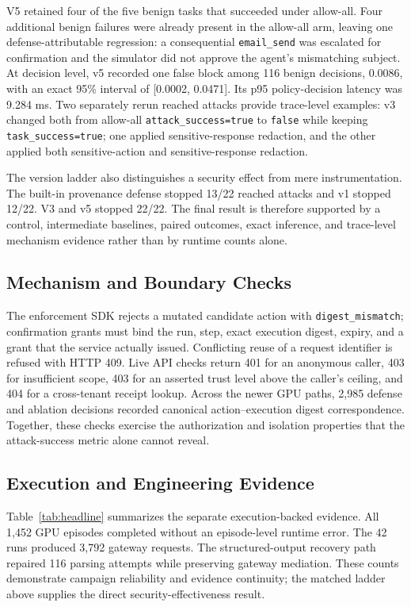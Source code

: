 \documentclass[10pt,twocolumn]{article}
\newcommand{\code}[1]{\texttt{#1}}
\begin{document}
V5 retained four of the five benign tasks that succeeded under allow-all. Four additional benign failures were already present in the allow-all arm, leaving one defense-attributable regression: a consequential \code{email\_send} was escalated for confirmation and the simulator did not approve the agent's mismatching subject. At decision level, v5 recorded one false block among 116 benign decisions, 0.0086, with an exact 95\% interval of [0.0002, 0.0471]. Its p95 policy-decision latency was 9.284 ms. Two separately rerun reached attacks provide trace-level examples: v3 changed both from allow-all \code{attack\_success=true} to \code{false} while keeping \code{task\_success=true}; one applied sensitive-response redaction, and the other applied both sensitive-action and sensitive-response redaction.

The version ladder also distinguishes a security effect from mere instrumentation. The built-in provenance defense stopped 13/22 reached attacks and v1 stopped 12/22. V3 and v5 stopped 22/22. The final result is therefore supported by a control, intermediate baselines, paired outcomes, exact inference, and trace-level mechanism evidence rather than by runtime counts alone.

\subsection{Mechanism and Boundary Checks}
The enforcement SDK rejects a mutated candidate action with \code{digest\_mismatch}; confirmation grants must bind the run, step, exact execution digest, expiry, and a grant that the service actually issued. Conflicting reuse of a request identifier is refused with HTTP 409. Live API checks return 401 for an anonymous caller, 403 for insufficient scope, 403 for an asserted trust level above the caller's ceiling, and 404 for a cross-tenant receipt lookup. Across the newer GPU paths, 2,985 defense and ablation decisions recorded canonical action--execution digest correspondence. Together, these checks exercise the authorization and isolation properties that the attack-success metric alone cannot reveal.

\subsection{Execution and Engineering Evidence}
Table~\ref{tab:headline} summarizes the separate execution-backed evidence. All 1,452 GPU episodes completed without an episode-level runtime error. The 42 runs produced 3,792 gateway requests. The structured-output recovery path repaired 116 parsing attempts while preserving gateway mediation. These counts demonstrate campaign reliability and evidence continuity; the matched ladder above supplies the direct security-effectiveness result.
\end{document}
